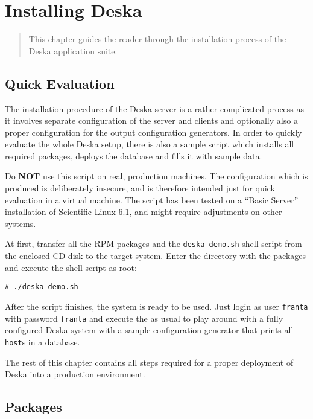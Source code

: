 \documentclass[deska]{subfiles}
\begin{document}
\chapter{Installing Deska}
\label{sec:building}

\begin{abstract}
This chapter guides the reader through the installation process of the Deska application suite.
\end{abstract}

\section{Quick Evaluation}

The installation procedure of the Deska server is a rather complicated process as it involves separate configuration of
the server and clients and optionally also a proper configuration for the output configuration generators.  In order to
quickly evaluate the whole Deska setup, there is also a sample script which installs all required packages, deploys the
database and fills it with sample data.

Do {\bf NOT} use this script on real, production machines.  The configuration which is produced is deliberately
insecure, and is therefore intended just for quick evaluation in a virtual machine.  The script has been tested on a
``Basic Server'' installation of Scientific Linux 6.1, and might require adjustments on other systems.

At first, transfer all the RPM packages and the {\tt deska-demo.sh} shell script from the enclosed CD disk to the target
system.  Enter the directory with the packages and execute the shell script as root:

\begin{verbatim}
# ./deska-demo.sh
\end{verbatim}

After the script finishes, the system is ready to be used.  Just login as user {\tt franta} with password {\tt franta}
and execute the  as usual to play around with a fully configured Deska system with a sample
configuration generator that prints all {\tt host}s in a database.

The rest of this chapter contains all steps required for a proper deployment of Deska into a production environment.

\section{Packages}
\end{document}
